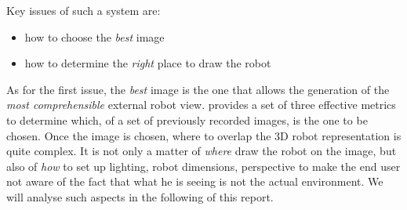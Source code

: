 %
Key issues of such a system are:
\begin{itemize}
\item how to choose the \textit{best} image
\item how to determine the \textit{right} place to draw the robot
\end{itemize}
%
As for the first issue, the \textit{best} image is the one that allows 
the generation of the \textit{most comprehensible} external robot view.
\cite{sugimoto} provides a set of three effective metrics to 
determine which, of a set of previously recorded images, is the 
one to be chosen.
%
Once the image is chosen, where to overlap the 3D robot representation 
is quite complex. It is not only a matter of \textit{where} draw the robot
on the image, but also of \textit{how} to set up lighting, robot dimensions,
perspective to make the end user not aware of the fact that what he is
seeing is not the actual environment.
%
We will analyse such aspects in the following of this report.

